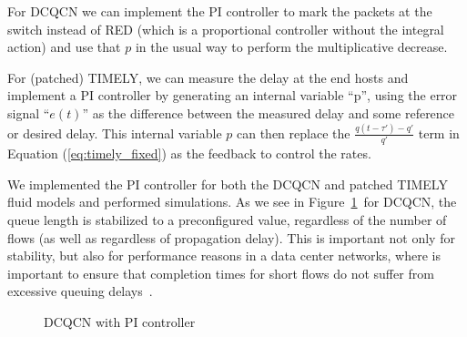 For DCQCN we can implement the PI controller to mark the packets at the switch
instead of RED (which is a proportional controller without the integral action)
and use that $p$ in the usual way to perform the multiplicative decrease. 

For (patched) TIMELY, we can measure the delay at the end hosts and implement a
PI controller by generating an internal variable ``p'', using the error signal
``$e(t)$'' as the difference between the measured delay and some reference or
desired delay. This internal variable $p$ can then replace the $\tfrac{{q(t -
\tau ') - q'}}{{q'}}$ term in Equation (\ref{eq:timely_fixed}) as the feedback
to control the rates.

We implemented the PI controller for both the DCQCN and patched TIMELY fluid
models and performed simulations. As we see in Figure~\ref{fig:dcqcn_pi}~for
DCQCN, the queue length is stabilized to a preconfigured value, regardless of
the number of flows (as well as regardless of propagation delay). This is
important not only for stability, but also for performance reasons in a data
center networks, where is important to ensure that completion times for short
flows do not suffer from excessive queuing delays~\cite{dctcp}.

\begin{figure}
\caption{DCQCN with PI controller}
\label{fig:dcqcn_pi}
\end{figure}

